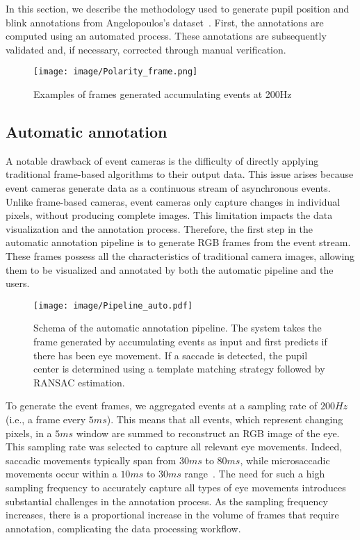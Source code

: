 \label{sec::ann}
In this section, we describe the methodology used to generate pupil position and blink annotations from Angelopoulos's dataset~\cite{angelopoulos2020event}. First, the annotations are computed using an automated process. These annotations are subsequently validated and, if necessary, corrected through manual verification.

\begin{figure}[t]
  \centering
  \texttt{[image: image/Polarity\_frame.png]}
  \caption{Examples of frames generated accumulating events at 200Hz}
  \label{fig:Polarity_frame}
\end{figure}

\subsection{Automatic annotation } \label{automatic_annotation }
A notable drawback of event cameras is the difficulty of directly applying traditional frame-based algorithms to their output data. This issue arises because event cameras generate data as a continuous stream of asynchronous events. Unlike frame-based cameras, event cameras only capture changes in individual pixels, without producing complete images. This limitation impacts the data visualization and the annotation process. Therefore, the first step in the automatic annotation pipeline is to generate RGB frames from the event stream. These frames possess all the characteristics of traditional camera images, allowing them to be visualized and annotated by both the automatic pipeline and the users.

\begin{figure}
\centering
\texttt{[image: image/Pipeline\_auto.pdf]}
\caption{Schema of the automatic annotation pipeline. The system takes the frame generated by accumulating events as input and first predicts if there has been eye movement. If a saccade is detected, the pupil center is determined using a template matching strategy followed by RANSAC estimation.}
\label{fig:auto_annotation_pipeline}
\end{figure}

To generate the event frames, we aggregated events at a sampling rate of $200 Hz$ (i.e., a frame every $5ms$). This means that all events, which represent changing pixels, in a $5ms$ window are summed to reconstruct an RGB image of the eye.  This sampling rate was selected to capture all relevant eye movements. Indeed, saccadic movements typically span from $30 ms$ to $80 ms$, while microsaccadic movements occur within a $10 ms$ to $30 ms$ range~\cite{holmqvist_eye_movements}. The need for such a high sampling frequency to accurately capture all types of eye movements introduces substantial challenges in the annotation process. As the sampling frequency increases, there is a proportional increase in the volume of frames that require annotation, complicating the data processing workflow.

